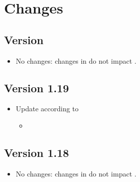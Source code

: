 \section{Changes}

\subsection*{Version \version}
\begin{itemize}
  \item No changes: changes in  do not impact \eacsl.
\end{itemize}

\subsection*{Version 1.19}
\begin{itemize}
  \item Update according to 
    \begin{itemize}
    \item {}
    \end{itemize}
\end{itemize}

\subsection*{Version 1.18}
\begin{itemize}
  \item No changes: changes in  do not impact \eacsl.
\end{itemize}

